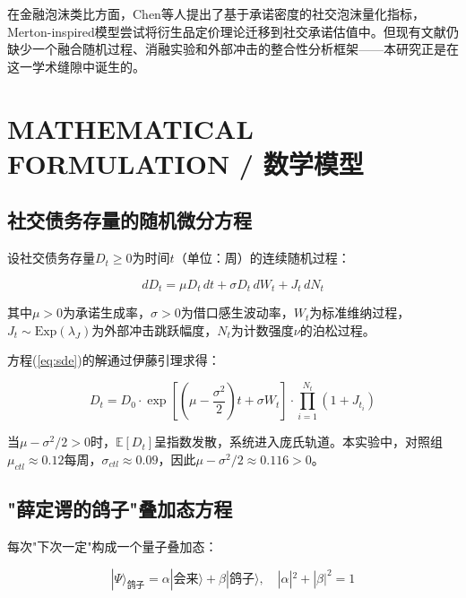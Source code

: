 \documentclass[journal]{IEEEtran}
\newcommand{\citet}[1]{\cite{#1}}
\begin{document}
在金融泡沫类比方面，Chen等人\citet{social_bubble}提出了基于承诺密度的社交泡沫量化指标，Merton-inspired模型\citet{merton_finance}尝试将衍生品定价理论迁移到社交承诺估值中。但现有文献仍缺少一个融合随机过程、消融实验和外部冲击的整合性分析框架——本研究正是在这一学术缝隙中诞生的。

\section{MATHEMATICAL FORMULATION / 数学模型}

\subsection{社交债务存量的随机微分方程}

设社交债务存量$D_t \geq 0$为时间$t$（单位：周）的连续随机过程：

\begin{equation}
\label{eq:sde}
dD_t = \mu D_t\,dt + \sigma D_t\,dW_t + J_t\,dN_t
\end{equation}

其中$\mu > 0$为承诺生成率，$\sigma > 0$为借口感生波动率，$W_t$为标准维纳过程，$J_t \sim \text{Exp}(\lambda_J)$为外部冲击跳跃幅度，$N_t$为计数强度$\nu$的泊松过程。

方程(\ref{eq:sde})的解通过伊藤引理求得：

\begin{equation}
\label{eq:solution}
D_t = D_0 \cdot \exp\left[\left(\mu - \frac{\sigma^2}{2}\right)t + \sigma W_t\right] \cdot \prod_{i=1}^{N_t} (1 + J_{t_i})
\end{equation}

当$\mu - \sigma^2/2 > 0$时，$\mathbb{E}[D_t]$呈指数发散，系统进入庞氏轨道。本实验中，对照组$\mu_{ctl} \approx 0.12$每周，$\sigma_{ctl} \approx 0.09$，因此$\mu - \sigma^2/2 \approx 0.116 > 0$。

\subsection{"薛定谔的鸽子"叠加态方程}

每次"下次一定"构成一个量子叠加态：

\begin{equation}
\label{eq:schrodinger}
|\Psi\rangle_{\text{鸽子}} = \alpha|\text{会来}\rangle + \beta|\text{鸽子}\rangle, \quad |\alpha|^2 + |\beta|^2 = 1
\end{equation}
\end{document}
